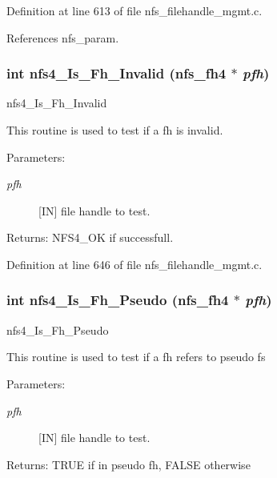 Definition at line 613 of file nfs\_\-filehandle\_\-mgmt.c.

References nfs\_\-param.
\subsubsection{\setlength{\rightskip}{0pt plus 5cm}int nfs4\_\-Is\_\-Fh\_\-Invalid (nfs\_\-fh4 $\ast$ {\em pfh})}\label{nfs__filehandle__mgmt_8c_a14}


nfs4\_\-Is\_\-Fh\_\-Invalid

This routine is used to test if a fh is invalid.

\begin{Desc}
\item[Parameters:]
\begin{description}
\item[{\em pfh}][IN] file handle to test.\end{description}
\end{Desc}
\begin{Desc}
\item[Returns:]NFS4\_\-OK if successfull. \end{Desc}


Definition at line 646 of file nfs\_\-filehandle\_\-mgmt.c.
\subsubsection{\setlength{\rightskip}{0pt plus 5cm}int nfs4\_\-Is\_\-Fh\_\-Pseudo (nfs\_\-fh4 $\ast$ {\em pfh})}\label{nfs__filehandle__mgmt_8c_a12}


nfs4\_\-Is\_\-Fh\_\-Pseudo

This routine is used to test if a fh refers to pseudo fs

\begin{Desc}
\item[Parameters:]
\begin{description}
\item[{\em pfh}][IN] file handle to test.\end{description}
\end{Desc}
\begin{Desc}
\item[Returns:]TRUE if in pseudo fh, FALSE otherwise \end{Desc}


